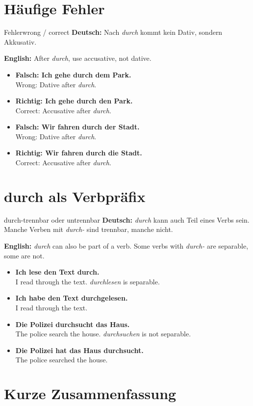 \documentclass[a4paper,11pt]{article}
\newcommand{\GermanText}[1]{\textbf{Deutsch: }#1\par}
\newcommand{\EnglishText}[1]{{\small\color{SoftGray}\textbf{English: }#1\par}}
\newcommand{\ExampleItem}[2]{\item \textbf{#1}\\{\small\color{SoftGray}#2}}
\begin{document}
\section{Häufige Fehler}

\begin{grammarentry}{Fehler}{wrong / correct}
\GermanText{Nach \textit{durch} kommt kein Dativ, sondern Akkusativ.}
\EnglishText{After \textit{durch}, use accusative, not dative.}

\begin{exbox}
\begin{itemize}
    \ExampleItem{Falsch: Ich gehe durch dem Park.}{Wrong: Dative after \textit{durch}.}
    \ExampleItem{Richtig: Ich gehe durch den Park.}{Correct: Accusative after \textit{durch}.}
    \ExampleItem{Falsch: Wir fahren durch der Stadt.}{Wrong: Dative after \textit{durch}.}
    \ExampleItem{Richtig: Wir fahren durch die Stadt.}{Correct: Accusative after \textit{durch}.}
\end{itemize}
\end{exbox}
\end{grammarentry}

\section{durch als Verbpräfix}

\begin{grammarentry}{durch-}{trennbar oder untrennbar}
\GermanText{\textit{durch} kann auch Teil eines Verbs sein. Manche Verben mit \textit{durch-} sind trennbar, manche nicht.}
\EnglishText{\textit{durch} can also be part of a verb. Some verbs with \textit{durch-} are separable, some are not.}

\begin{exbox}
\begin{itemize}
    \ExampleItem{Ich lese den Text durch.}{I read through the text. \textit{durchlesen} is separable.}
    \ExampleItem{Ich habe den Text durchgelesen.}{I read through the text.}
    \ExampleItem{Die Polizei durchsucht das Haus.}{The police search the house. \textit{durchsuchen} is not separable.}
    \ExampleItem{Die Polizei hat das Haus durchsucht.}{The police searched the house.}
\end{itemize}
\end{exbox}
\end{grammarentry}

\section{Kurze Zusammenfassung}
\end{document}
